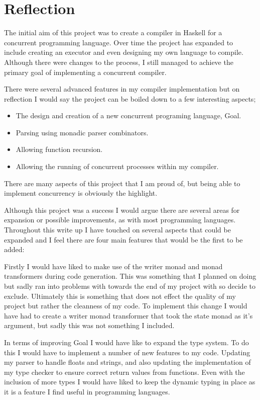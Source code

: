 \section{Reflection}

The initial aim of this project was to create a compiler in Haskell for a concurrent programming language. Over time the project has expanded to include creating an executor and even designing my own language to compile. Although there were changes to the process, I still managed to achieve the primary goal of implementing a concurrent compiler.

There were several advanced features in my compiler implementation but on reflection I would say the project can be boiled down to a few interesting aspects;

\begin{itemize}
\item The design and creation of a new concurrent programing language, Goal.
\item Parsing using monadic parser combinators.
\item Allowing function recursion. 
\item Allowing the running of concurrent processes within my compiler.
\end{itemize}

There are many aspects of this project that I am proud of, but being able to implement concurrency is obviously the highlight. 

Although this project was a success I would argue there are several areas for expansion or possible improvements, as with most programming languages. Throughout this write up I have touched on several aspects that could be expanded and I feel there are four main features that would be the first to be added:

Firstly I would have liked to make use of the writer monad and monad transformers during code generation. This was something that I planned on doing but sadly ran into problems with towards the end of my project with so decide to exclude. Ultimately this is something that does not effect the quality of my project but rather the cleanness of my code. To implement this change I would have had to create a writer monad transformer that took the state monad as it's argument, but sadly this was not something I included.   

In terms of improving Goal I would have like to expand the type system. To do this I would have to implement a number of new features to my code. Updating my parser to handle floats and strings, and also updating the implementation of my type checker to ensure correct return values from functions. Even with the inclusion of more types I would have liked to keep the dynamic typing in place as it is a feature I find useful in programming languages.


